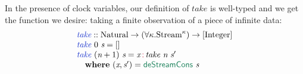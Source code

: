 \documentclass[natbib]{sigplanconf}
\newcommand{\cons}[1]{\textcolor{cons}{\textsf{#1}}}
\newcommand{\elim}[1]{\textcolor{elim}{\textsf{#1}}}
\newcommand{\kw}[1]{\textbf{#1}}
\newcommand{\tyname}[1]{\textrm{#1}}
\newcommand{\ident}[1]{\textit{#1}}
\newcommand{\defn}[1]{\textcolor{defnd}{\ident{#1}}}
\begin{document}
In the presence of clock variables, our definition of $\ident{take}$
is well-typed and we get the function we desire: taking a finite
observation of a piece of infinite data:
\begin{displaymath}
  \begin{array}{l}
    \defn{take} :: \tyname{Natural} \to (\forall \kappa. \tyname{Stream}^\kappa) \to [\tyname{Integer}] \\
    \defn{take}\ 0\ \ident{s} = [] \\
    \defn{take}\ (\ident{n}+1)\ \ident{s} = \ident{x} \mathop{\cons{:}} \ident{take}\ \ident{n}\ \ident{s$'$} \\
    \quad \kw{where}\ (\ident{x}, \ident{s$'$}) = \elim{deStreamCons}\ \ident{s}
  \end{array}
\end{displaymath}
\end{document}
